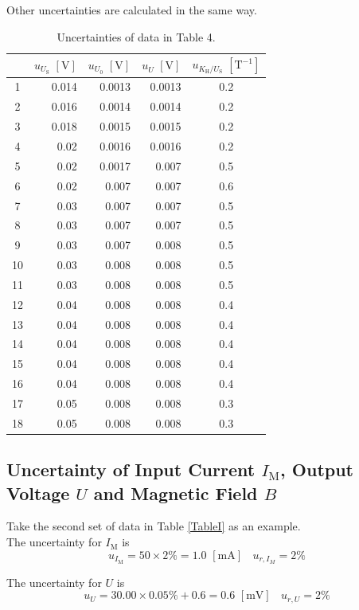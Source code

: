 \documentclass{article}
\begin{document}
Other uncertainties are calculated in the same way.

\begin{table}[H]
\centering
\begin{tabular}{crrrc}
\toprule
& $u_{U_\text{S}}\,\,[\text{V}]$ & $u_{U_0}\,\,[\text{V}]$ & $u_U\,\,[\text{V}]$ & $u_{K_\text{H}/U_\text{S}}\,\,[\text{T}^{-1}]$\\
\midrule
  1 & 0.014 & 0.0013 &0.0013 &0.2 \\
  2 & 0.016 & 0.0014 &0.0014 &0.2 \\
  3 & 0.018 & 0.0015 &0.0015 &0.2 \\
  4 & 0.02 & 0.0016 &0.0016 &0.2 \\
  5 & 0.02 & 0.0017& 0.007 & 0.5\\
  6 & 0.02 & 0.007 & 0.007 & 0.6\\
  7 & 0.03 & 0.007 & 0.007 & 0.5\\
  8 & 0.03 & 0.007 & 0.007 & 0.5\\
  9 & 0.03 & 0.007 & 0.008 & 0.5\\
  10 & 0.03 &0.008  &0.008  &0.5 \\
  11 & 0.03 &0.008  &0.008  &0.5 \\
  12 & 0.04 &0.008  &0.008  &0.4 \\
  13 & 0.04 &0.008  &0.008  &0.4 \\
  14 & 0.04 &0.008  &0.008  &0.4 \\
  15 & 0.04 &0.008  &0.008  &0.4 \\
  16 & 0.04 &0.008  &0.008  &0.4 \\
  17 & 0.05 &0.008  &0.008  &0.3 \\
  18 & 0.05 &0.008  &0.008  &0.3 \\
\bottomrule
\end{tabular}
\caption{Uncertainties of data in Table 4.}\label{TableUncK}
\end{table}

	\subsection{Uncertainty of Input Current $I_\text{M}$, Output Voltage $U$ and Magnetic Field $B$}

Take the second set of data in Table \ref{TableI} as an example.\\

The uncertainty for $I_\text{M}$ is
$$u_{I_\text{M}} = 50\times 2\% = 1.0\,\,[\text{mA}]~~~~u_{r,I_M} = 2\%$$

The uncertainty for $U$ is 
$$u_U = 30.00\times 0.05\%+0.6 = 0.6\,\,[\text{mV}]~~~~u_{r,U} = 2\%$$
\end{document}
